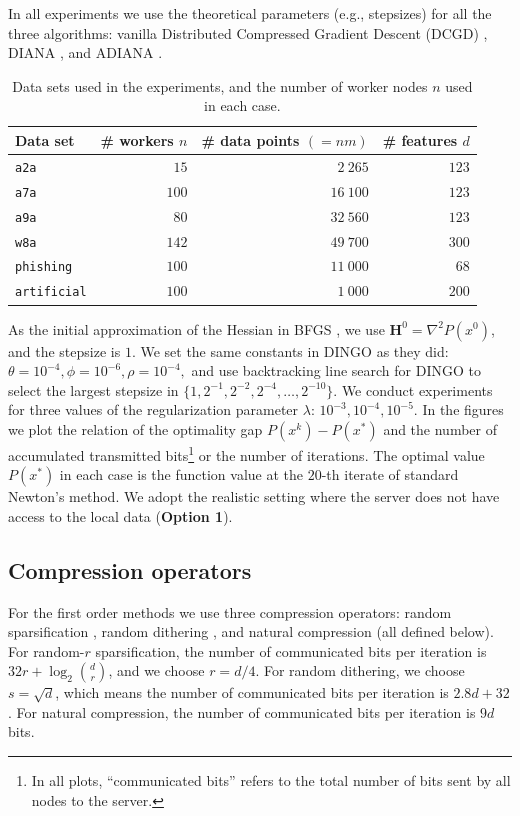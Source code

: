 \documentclass[10pt]{article}
\newcommand{\mH}{\mathbf{H}}
\begin{document}
In all experiments we use the theoretical parameters (e.g., stepsizes) for all the three algorithms: vanilla Distributed Compressed Gradient Descent (DCGD) \citep{KFJ}, DIANA \citep{DIANA}, and ADIANA \citep{ADIANA}. 

\begin{table}[h]
	\caption{Data sets used in the experiments, and the number of worker nodes $n$ used in each case.}
	\label{table1}
	\begin{center}
		\begin{tabular}{| l | r | r | r |}
			\toprule
			{\bf Data set}  & \bf \# workers $n$ &{\bf \# data points} $(=nm)$ & \bf\# features $d$ \\
			\midrule 
			{\tt a2a} & $15$ & $2~265$ & $123$\\ \hline
			{\tt a7a} & $100$ & $16~100$ & $123$\\ \hline
			{\tt a9a} & $80$ & $32~560$ & $123$\\ \hline
			{\tt w8a} & $142$ & $49~700$ & $300$\\ \hline
			{\tt phishing} & $100$ & $11~000$ & $68$\\ \hline
			{\tt artificial} & $100$ & $1~000$ & $200$\\
			\bottomrule
		\end{tabular}
	\end{center}
\end{table}


As the initial approximation of the Hessian in BFGS \citep{Broyden1967, Fletcher1970, Goldfarb1970, shanno1970conditioning}, we use $\mH^0 = \nabla^2P(x^0)$, and the stepsize is $1$. We set the same constants in DINGO \citep{DINGO2019} as they did: $\theta=10^{-4}, \phi=10^{-6}, \rho=10^{-4},$ and use backtracking line search for DINGO to select the largest stepsize in $\{1, 2^{-1}, 2^{-2}, 2^{-4},\dots, 2^{-10}\}$. We conduct experiments for three values of the regularization parameter $\lambda$: $10^{-3}, 10^{-4}, 10^{-5}$.  
In the figures we plot the relation of the optimality gap $P(x^k) - P(x^*)$ and the number of accumulated transmitted bits\footnote{In all plots, ``communicated bits'' refers to the total number of bits sent by all nodes to the server.} or the number of iterations. The optimal value $P(x^*)$ in each case is the function value at the $20$-th iterate of standard Newton's method.  We adopt the realistic setting where the server does not have access to the local data ({\bf Option 1}).



\subsection{Compression operators} For the first order methods we use three compression operators: random sparsification \citep{stich2018sparsified}, random dithering \citep{Alistarh17}, and natural compression \citep{Cnat} (all defined below).
For random-$r$ sparsification, the number of communicated  bits per iteration is $32r+\log_2{\binom{d}{r}}$, and we choose $r = d/4$. For random dithering, we choose $s = \sqrt{d}$, which means the
number of communicated bits per iteration is $2.8d + 32$. For natural compression, the number of communicated bits per iteration is $9d$ bits. 
\end{document}
